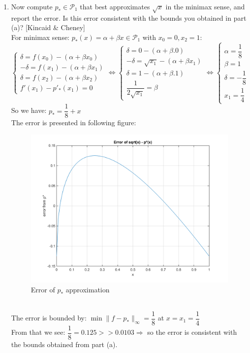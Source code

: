 \documentclass[14pt,a4paper]{article}
\begin{document}
\begin{enumerate}
	\label{1c}
	\item Now compute $p_* \in \mathcal{P}_1$ that best approximates $\sqrt{x}$ in the minimax sense, and report the error. Is this error consistent with the bounds you obtained in part (a)? [Kincaid \& Cheney]\\
	For minimax sense: $p_*(x) = \alpha + \beta x \in \mathcal{P}_1$ with $x_0 = 0, x_2=1$:\\
	$\begin{cases} \delta = f(x_0) - (\alpha + \beta x_0) \\ -\delta = f(x_1) - (\alpha + \beta x_1) \\ \delta = f(x_2) - (\alpha + \beta x_2) \\ f'(x_1) - p'_*(x_1) = 0  \end{cases} \Leftrightarrow \begin{cases} \delta = 0 - (\alpha + \beta .0) \\ -\delta = \sqrt{x_1} - (\alpha + \beta x_1) \\ \delta = 1 - (\alpha + \beta .1) \\ \dfrac{1}{2\sqrt{x_1}} = \beta \end{cases} \Leftrightarrow \begin{cases} \alpha = \dfrac{1}{8} \\ \beta = 1 \\ \delta = -\dfrac{1}{8} \\ x_1 = \dfrac{1}{4} \end{cases}$ \\
	So we have: $p_* = \dfrac{1}{8} + x$\\
	The error is presented in following figure:
	\begin{figure}[htp]
		\centering
		\includegraphics[scale=0.7]{hw3_11c.png}
		\caption{Error of $p_*$ approximation}
	\end{figure}\\
	The error is bounded by: $\min\|f-p_*\|_{\infty} = \dfrac{1}{8}$ at $x=x_1= \dfrac{1}{4}$\\
	From that we see: $\dfrac{1}{8} = 0.125 >> 0.0103 \Rightarrow $ so the error is consistent with the bounds obtained from part (a).\\
\end{enumerate}
\pagebreak
\end{document}
